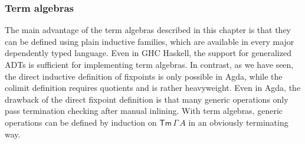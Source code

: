 \documentclass[12pt,a4paper,twoside,openany]{book}
\theoremstyle{remark}
\theoremstyle{definition}
\theoremstyle{theorem}
\newcommand{\Tm}{\mathsf{Tm}}
\begin{document}
\subsubsection{Term algebras}
The main advantage of the term algebras described in this chapter is that they
can be defined using plain inductive families, which are available in every
major dependently typed language. Even in GHC Haskell, the support for
generalized ADTs is sufficient for implementing term algebras. In contrast, as
we have seen, the direct inductive definition of fixpoints is only possible in
Agda, while the colimit definition requires quotients and is rather
heavyweight. Even in Agda, the drawback of the direct fixpoint definition is
that many generic operations only pass termination checking after manual
inlining. With term algebras, generic operations can be defined by induction on
$\Tm\,\Gamma\,A$ in an obviously terminating way.
\end{document}
